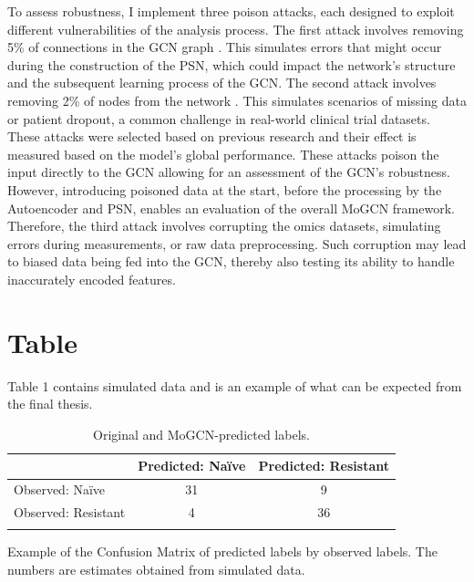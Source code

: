 \documentclass[unnumsec,webpdf,modern,large]{oup-authoring-template}
\theoremstyle{thmstyleone}%
\theoremstyle{thmstyletwo}%
\theoremstyle{thmstylethree}%
\begin{document}
\par To assess robustness, I implement three poison attacks, each designed to exploit different vulnerabilities of the analysis process. The first attack involves removing 5\% of connections in the GCN graph \cite{zugner2020certifiable}. This simulates errors that might occur during the construction of the PSN, which could impact the network's structure and the subsequent learning process of the GCN. The second attack involves removing 2\% of nodes from the network \cite{finkelshtein2022single}. This simulates scenarios of missing data or patient dropout, a common challenge in real-world clinical trial datasets. These attacks were selected based on previous research and their effect is measured based on the model’s global performance. These attacks poison the input directly to the GCN allowing for an assessment of the GCN's robustness. However, introducing poisoned data at the start, before the processing by the Autoencoder and PSN, enables an evaluation of the overall MoGCN framework. Therefore, the third attack involves corrupting the omics datasets, simulating errors during measurements, or raw data preprocessing. Such corruption may lead to biased data being fed into the GCN, thereby also testing its ability to handle inaccurately encoded features.

\section{Table}

Table 1 contains simulated data and is an example of what can be expected from the final thesis.

\begin{table}[b]

\caption{Original and MoGCN-predicted labels.\label{tab1}}

\begin{tabular}{@{}lcc@{}}
\toprule
  & Predicted: Naïve & Predicted: Resistant\\
\midrule
Observed: Naïve & 31 & 9 \\
Observed: Resistant & 4 & 36 \\
\botrule
\end{tabular}

\begin{tablenotes}%
\item Example of the Confusion Matrix of predicted labels by observed labels. The numbers are estimates obtained from simulated data.
\end{tablenotes}

\end{table}
\end{document}
